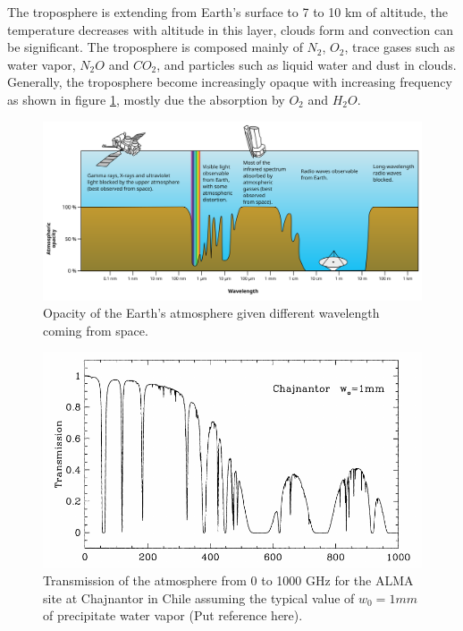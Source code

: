 \documentclass[11pt]{article}
\begin{document}
The troposphere is extending from Earth's surface to 7 to 10 km of altitude, the temperature decreases with altitude in this layer, clouds form and convection can be significant. The troposphere is composed mainly of $N_2$, $O_2$, trace gases such as water vapor, $N_2O$ and $CO_2$, and particles such as liquid water and dust in clouds. Generally, the troposphere become increasingly opaque with increasing frequency as shown in figure \ref{fig:atmospheric-opacity}, mostly due the absorption by $O_2$ and $H_2O$.

\begin{figure}[htbp]
\includegraphics[width=\textwidth]{images/Atmospheric_electromagnetic_opacity}
\caption{Opacity of the Earth's atmosphere given different wavelength coming from space.}
\label{fig:atmospheric-opacity}
\end{figure}

\begin{figure}[htbp]
\includegraphics[width=\textwidth]{images/chajnantor-atm-transmission}
\caption{Transmission of the atmosphere from 0 to 1000 GHz for the ALMA site at Chajnantor in Chile assuming the typical value of $w_0 = 1 mm$ of precipitate water vapor (Put reference here).}
\label{fig:chaj-atm-tx}
\end{figure}
\end{document}
